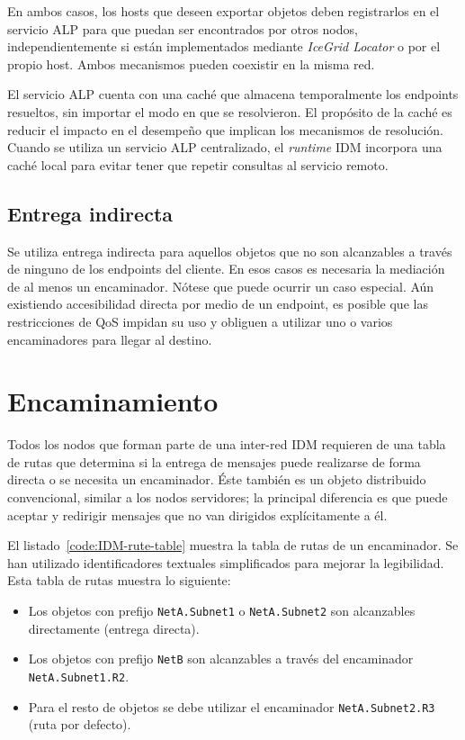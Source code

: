 \documentclass{arco-article}
\newcommand{\fg}[1]{\textit{#1}}
\begin{document}
En ambos casos, los hosts que deseen exportar objetos deben
registrarlos en el servicio \ac{ALP} para que puedan ser encontrados
por otros nodos, independientemente si están implementados mediante
\emph{IceGrid Locator} o por el propio host.  Ambos mecanismos pueden
coexistir en la misma red.

El servicio \ac{ALP} cuenta con una caché que almacena temporalmente
los endpoints resueltos, sin importar el modo en que se
resolvieron.  El propósito de la caché es reducir el impacto en el
desempeño que implican los mecanismos de resolución. Cuando se utiliza
un servicio \ac{ALP} centralizado, el \fg{runtime} \ac{IDM} incorpora
una caché local para evitar tener que repetir consultas al servicio
remoto.


\subsection{Entrega indirecta}

Se utiliza entrega indirecta para aquellos objetos que no son
alcanzables a través de ninguno de los endpoints del cliente.  En
esos casos es necesaria la mediación de al menos un encaminador.
Nótese que puede ocurrir un caso especial.  Aún existiendo
accesibilidad directa por medio de un endpoint, es posible que
las restricciones de \ac{QoS} impidan su uso y obliguen a utilizar uno
o varios encaminadores para llegar al destino.


\section{Encaminamiento}

Todos los nodos que forman parte de una inter-red \ac{IDM} requieren
de una tabla de rutas que determina si la entrega de mensajes puede
realizarse de forma directa o se necesita un encaminador. Éste también
es un objeto distribuido convencional, similar a los nodos servidores; la
principal diferencia es que puede aceptar y redirigir mensajes que no
van dirigidos explícitamente a él.

El listado~\ref{code:IDM-rute-table} muestra la tabla de rutas de un
encaminador. Se han utilizado identificadores textuales simplificados
para mejorar la legibilidad.  Esta tabla de rutas muestra lo
siguiente:

\begin{itemize}
\item Los objetos con prefijo {\small\texttt{NetA.Subnet1}} o
  {\small\texttt{NetA.Subnet2}} son alcanzables directamente (entrega
  directa).

\item Los objetos con prefijo {\small\texttt{NetB}} son alcanzables a través
  del encaminador {\small\texttt{NetA.Subnet1.R2}}.

\item Para el resto de objetos se debe utilizar el encaminador
  {\small\texttt{NetA.Subnet2.R3}} (ruta por defecto).
\end{itemize}
\end{document}
